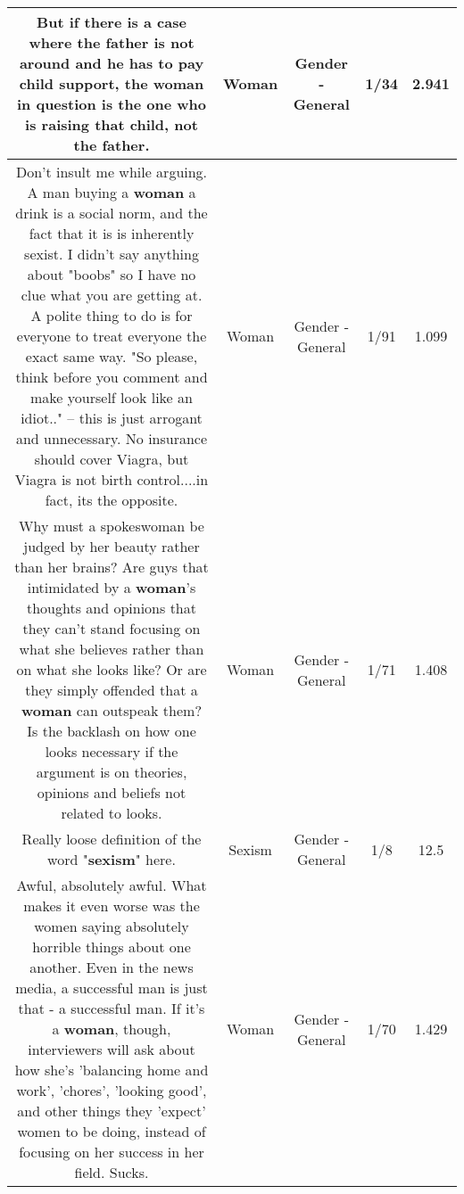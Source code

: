 \documentclass[11pt]{article}
\newlength\mylength
\begin{document}
\begin{center}
\begin{longtable}{|C{.65\mylength}|C{.30\mylength}|C{.12\mylength}|C{.12\mylength}|C{.12\mylength}|}
  \small But if there is a case where the father is not around and he has to pay child support, the \textbf{woman} in question is the one who is raising that child, not the father.\normalsize   & Woman & Gender - General & 1/34 & 2.941 \\  \hline
  \small Don't insult me while arguing. A man buying a \textbf{woman} a drink is a social norm, and the fact that it is is inherently sexist. I didn't say anything about "boobs" so I have no clue what you are getting at. A polite thing to do is for everyone to treat everyone the exact same way. "So please, think before you comment and make yourself look like an idiot.." -- this is just arrogant and unnecessary. No insurance should cover Viagra, but Viagra is not birth control....in fact, its the opposite.\normalsize   & Woman & Gender - General & 1/91 & 1.099 \\  \hline
  \small Why must a spokeswoman be judged by her beauty rather than her brains? Are guys that intimidated by a \textbf{woman}'s thoughts and opinions that they can't stand focusing on what she believes rather than on what she looks like? Or are they simply offended that a \textbf{woman} can outspeak them? Is the backlash on how one looks necessary if the argument is on theories, opinions and beliefs not related to looks.\normalsize   & Woman & Gender - General & 1/71 & 1.408 \\  \hline
  \small Really loose definition of the word "\textbf{sexism}" here.\normalsize   & Sexism & Gender - General & 1/8 & 12.5 \\  \hline
  \small Awful, absolutely awful. What makes it even worse was the women saying absolutely horrible things about one another.  Even in the news media, a successful man is just that - a successful man. If it's a \textbf{woman}, though, interviewers will ask about how she's 'balancing home and work', 'chores', 'looking good', and other things they 'expect' women to be doing, instead of focusing on her success in her field. Sucks.\normalsize   & Woman & Gender - General & 1/70 & 1.429 \\  \hline

\end{longtable}
\end{center}
\end{document}
